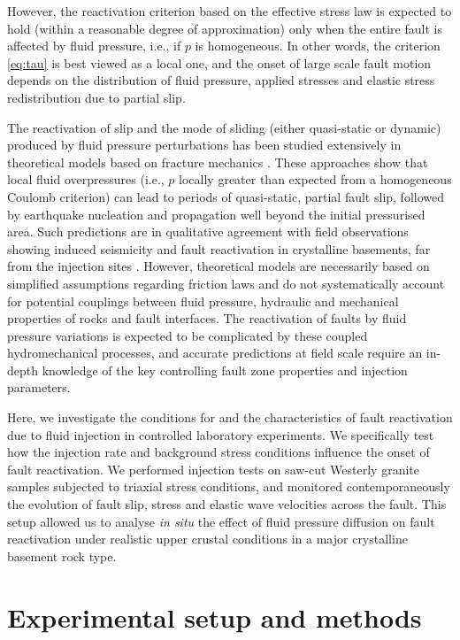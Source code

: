 \documentclass[grl]{agutex2arxiv}
\begin{document}
\begin{article}
However, the reactivation criterion based on the effective stress law is expected to hold (within a reasonable degree of approximation) only when the entire fault is affected by fluid pressure, i.e., if $p$ is homogeneous. In other words, the criterion \ref{eq:tau} is best viewed as a local one, and the onset of large scale fault motion depends on the distribution of fluid pressure, applied stresses and elastic stress redistribution due to partial slip.

The reactivation of slip and the mode of sliding (either quasi-static or dynamic) produced by fluid pressure perturbations has been studied extensively in theoretical models based on fracture mechanics \citep{Viesca2012,Garagash2012,Galis2017}. These approaches show that local fluid overpressures (i.e., $p$ locally greater than expected from a homogeneous Coulomb criterion) can lead to periods of quasi-static, partial fault slip, followed by earthquake nucleation and propagation well beyond the initial pressurised area. Such predictions are in qualitative agreement with field observations showing induced seismicity and fault reactivation in crystalline basements, far from the injection sites \citep[e.g.][]{Keranen2013}. However, theoretical models are necessarily based on simplified assumptions regarding friction laws and do not systematically account for potential couplings between fluid pressure, hydraulic and mechanical properties of rocks and fault interfaces. The reactivation of faults by fluid pressure variations is expected to be complicated by these coupled hydromechanical processes, and accurate predictions at field scale require an in-depth knowledge of the key controlling fault zone properties and injection parameters.

Here, we investigate the conditions for and the characteristics of fault reactivation due to fluid injection in controlled laboratory experiments. We specifically test how the injection rate and background stress conditions influence the onset of fault reactivation. We performed injection tests on saw-cut Westerly granite samples subjected to triaxial stress conditions, and monitored contemporaneously the evolution of fault slip, stress and elastic wave velocities across the fault. This setup allowed us to analyse \emph{in situ} the effect of fluid pressure diffusion on fault reactivation under realistic upper crustal conditions in a major crystalline basement rock type.

\section{Experimental setup and methods}


\end{article}
\end{document}
